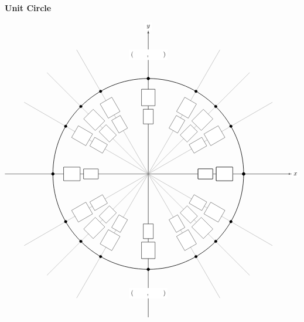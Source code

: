 \documentclass[11pt,letterpaper]{article}
\begin{document}

\begin{center} {\bfseries \huge Unit Circle} \end{center}

	\[
	\begin{tikzpicture}[scale=5.3,cap=round,>=latex]

        \draw[->] (-1.5cm ,0cm) -- (1.5cm, 0cm) node[right, fill= white] {$x$};
        \draw[->] (0cm, -1.5cm) -- (0cm, 1.5cm) node[above, fill= white] {$y$};

        \draw[thick] (0cm,0cm) circle(1cm);

        \foreach \x in {0,30,...,360} {
                \draw[gray] (0cm, 0cm) -- (\x:1.5cm);
                \filldraw[black] (\x:1cm) circle(0.4pt);
		\draw node[draw, fill= white, shape= rectangle, minimum height= 0.55cm, minimum width= 0.8cm, anchor= center, rotate= \x] at (\x:0.6cm) {};
		\draw node[draw, fill= white, shape= rectangle, minimum height= 0.75cm, minimum width= 0.9cm, anchor= center, rotate= \x] at (\x:0.8cm) {};
	}
	
	\foreach \x in {0,45,...,360} {
		\draw[gray] (0cm, 0cm) -- (\x:1.5cm);
		\filldraw[black] (\x:1cm) circle(0.4pt);
		\draw node[draw, fill= white, shape= rectangle, minimum height= 0.55cm, minimum width= 0.8cm, anchor= center, rotate= \x] at (\x:0.6cm) {};
		\draw node[draw, fill= white, shape= rectangle, minimum height= 0.75cm, minimum width= 0.9cm, anchor= center, rotate= \x] at (\x:0.8cm) {};
	}
		
        \draw %
	(0cm,-1.25cm) node[fill=white] {$(\hspace{.75cm},\hspace{.75cm})$}
	(0cm,1.25cm)  node[fill=white] {$(\hspace{.75cm},\hspace{.75cm})$};


\end{tikzpicture}\]
\end{document}
